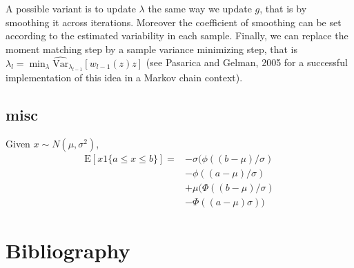 \documentclass{article}
\begin{document}
A possible variant is to update $\lambda$ the same way we update
$g$, that is by smoothing it across iterations. Moreover the
coefficient of smoothing can be set according to the estimated
variability in each sample. Finally, we can replace the moment
matching step by a sample variance minimizing step, that is
$\lambda_l = \min_\lambda
\widehat{\mathrm{Var}}_{\lambda_{l-1}}[w_{l-1}(z) z]$ (see Pasarica
and Gelman, 2005 for a successful implementation of this idea in a
Markov chain context).


\subsection{misc}
Given $x\sim N(\mu,\sigma^2)$,
\begin{align}
\mathrm{E}[x 1\{a\leq x\leq
  b\}] = &-\sigma(\phi((b-\mu)/\sigma)\\\nonumber
  & -\phi((a-\mu)/\sigma)\\\nonumber
  & +\mu(\Phi((b-\mu)/\sigma)\\\nonumber
    & -\Phi((a-\mu)\sigma))
\end{align}

\section*{Bibliography}
\printbibliography[heading=none]
\end{document}
